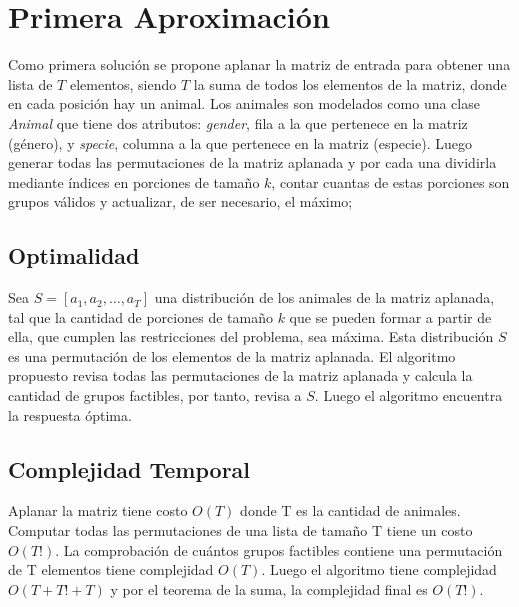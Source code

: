 \documentclass[article]{llncs}
\begin{document}
\section{Primera Aproximaci\'on}

Como primera soluci\'on se propone aplanar la matriz de entrada para 
obtener una lista de $T$ elementos, siendo $T$ la suma de todos los elementos de la matriz,
 donde en cada posici\'on hay un animal. 
Los animales son modelados como una clase \emph{Animal} que tiene dos 
atributos: \emph{gender}, fila a la que pertenece en la matriz (g\'enero),  
y \emph{specie}, columna a la que pertenece en la matriz (especie). Luego 
generar todas las permutaciones de la matriz aplanada y por cada una 
dividirla mediante \'indices en porciones de tamaño $k$, contar cuantas 
de estas porciones son grupos v\'alidos y actualizar, de ser necesario, el 
máximo;   

\subsection{Optimalidad}
Sea $S = [a_1, a_2, \dots, a_T]$ una distribución de los animales de la 
matriz aplanada, tal que la cantidad de porciones de tamaño $k$ que se pueden 
formar a partir de ella, que cumplen las restricciones del problema, sea máxima. 
Esta distribución $S$ es una permutación de los elementos de la matriz aplanada. 
El algoritmo propuesto revisa todas las permutaciones de la matriz aplanada y 
calcula la cantidad de grupos factibles, por tanto, revisa a $S$. Luego 
el algoritmo encuentra la respuesta óptima.

\subsection{Complejidad Temporal}

Aplanar la matriz tiene costo $O(T)$ donde T es la cantidad 
de animales. Computar todas las permutaciones de una lista 
de tamaño T tiene un costo $O(T!)$. La comprobación 
de cuántos grupos factibles contiene una permutación de T 
elementos tiene complejidad $O(T)$. Luego el algoritmo 
tiene complejidad $O(T + T! + T)$ y por el teorema de la 
suma, la complejidad final es $O(T!)$.
\end{document}
